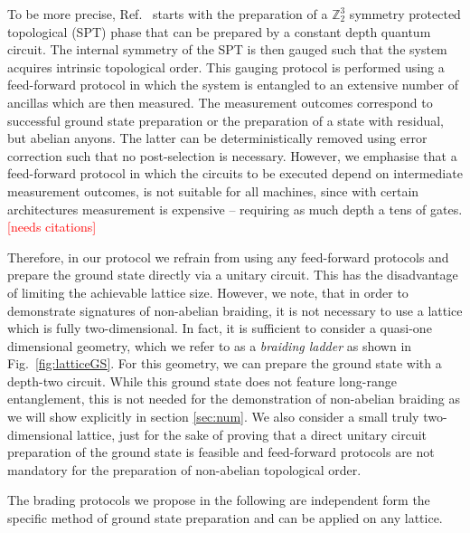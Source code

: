 \documentclass[two column]{article}
\newcommand{\caro}[1]{\textcolor{red}{[#1]}}
\begin{document}
To be more precise, Ref.~\cite{iqbal2023creation} starts with the preparation of a $\mathbb Z_2^3$ symmetry protected topological (SPT) phase that can be prepared by a constant depth quantum circuit. The internal symmetry of the SPT is then gauged such that the system acquires intrinsic topological order. This gauging protocol is performed using a feed-forward protocol in which the system is entangled to an extensive number of ancillas which are then measured. The measurement outcomes correspond to successful ground state preparation or the preparation of a state with residual, but abelian anyons. The latter can be deterministically removed using error correction such that no post-selection is necessary. However, we emphasise that a feed-forward protocol in which the circuits to be executed depend on intermediate measurement outcomes, is not suitable for all machines, since with certain architectures measurement is expensive -- requiring as much depth a tens of gates. \caro{needs citations} 

Therefore, in our protocol we refrain from using any feed-forward protocols and prepare the ground state directly via a unitary circuit. This has the disadvantage of limiting the achievable lattice size. However, we note, that in order to demonstrate signatures of non-abelian braiding, it is not necessary to use a lattice which is fully two-dimensional. In fact, it is sufficient to consider a quasi-one dimensional geometry, which we refer to as a \emph{braiding ladder} as shown in Fig.~\ref{fig:latticeGS}. For this geometry, we can prepare the ground state with a depth-two circuit. While this ground state does not feature long-range entanglement, this is not needed for the demonstration of non-abelian braiding as we will show explicitly in section \ref{sec:num}. We also consider a small truly two-dimensional lattice, just for the sake of proving that a direct unitary circuit preparation of the ground state is feasible and feed-forward protocols are not mandatory for the preparation of non-abelian topological order.

The brading protocols we propose in the following are independent form the specific method of ground state preparation and can be applied on any lattice.
\end{document}
